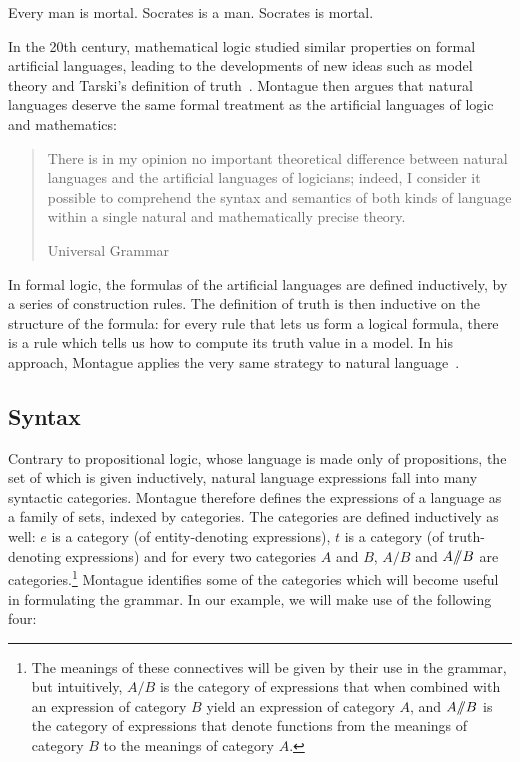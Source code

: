 \begin{exe}
  \ex Every man is mortal. Socrates is a man. \label{ex:syllogism-hypothesis}
  \ex Socrates is mortal. \label{ex:syllogism-conclusion}
\end{exe}

In the 20th century, mathematical logic studied similar properties on
formal artificial languages, leading to the developments of new ideas such
as model theory and Tarski's definition of
truth~\cite{sep-tarski-truth,tarski1986arithmetical}. Montague then argues
that natural languages deserve the same formal treatment as the artificial
languages of logic and mathematics:

\begin{quote}
  There is in my opinion no important theoretical difference between
  natural languages and the artificial languages of logicians; indeed, I
  consider it possible to comprehend the syntax and semantics of both kinds
  of language within a single natural and mathematically precise theory.

  \begin{flushright}
  Universal Grammar~\cite{montague1970universal}
  \end{flushright}
\end{quote}

In formal logic, the formulas of the artificial languages are defined
inductively, by a series of construction rules. The definition of truth is
then inductive on the structure of the formula: for every rule that lets us
form a logical formula, there is a rule which tells us how to compute its
truth value in a model. In his approach, Montague applies the very same
strategy to natural language~\cite{montague1973proper}.


\subsection{Syntax}
\label{ssec:montague-syntax}

Contrary to propositional logic, whose language is made only of
propositions, the set of which is given inductively, natural language
expressions fall into many syntactic categories. Montague therefore defines
the expressions of a language as a family of sets, indexed by
categories. The categories are defined inductively as well: $e$ is a
category (of entity-denoting expressions), $t$ is a category (of
truth-denoting expressions) and for every two categories $A$ and $B$,
$A / B$ and $A /\!\!/ B$ are categories.\footnote{The meanings of
  these connectives will be given by their use in the grammar, but
  intuitively, $A / B$ is the category of expressions that when combined
  with an expression of category $B$ yield an expression of category $A$,
  and $A /\!\!/ B$ is the category of expressions that denote
  functions from the meanings of category $B$ to the meanings of category
  $A$.}  Montague identifies some of the categories which will become
useful in formulating the grammar. In our example, we will make use of the
following four:

